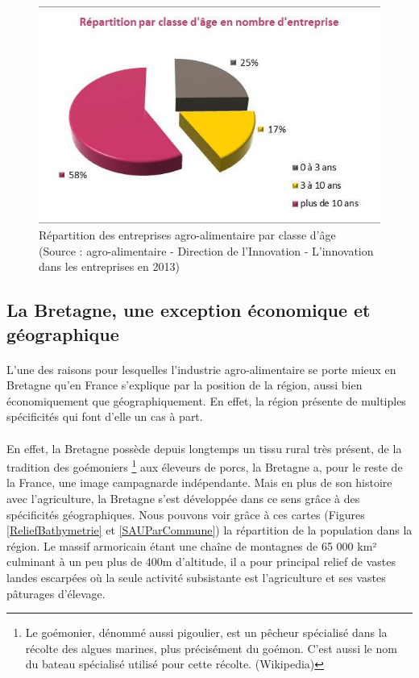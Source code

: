 \documentclass[a4paper,12pt]{report}
\begin{document}
	\begin{figure}[!h]
	\centering
	\includegraphics[scale=1]{Illustrations/RepartitionClasseAge.png}
	\caption{Répartition des entreprises agro-alimentaire par classe d'âge\\(Source : agro-alimentaire - Direction de l’Innovation - L’innovation dans les entreprises en 2013\cite{InnovationEntreprises2013})}
	\label{RepartitionParTaille}
	\end{figure}

		\subsection{La Bretagne, une exception économique et géographique}
			\paragraph{}L’une des raisons pour lesquelles l’industrie agro-alimentaire se porte mieux en Bretagne qu’en France s’explique par la position de la région, aussi bien économiquement que géographiquement. En effet, la région présente de multiples spécificités qui font d’elle un cas à part.
			
			\paragraph{}En effet, la Bretagne possède depuis longtemps un tissu rural très présent, de la tradition des goémoniers \footnote{Le goémonier, dénommé aussi pigoulier, est un pêcheur spécialisé dans la récolte des algues marines, plus précisément du goémon. C'est aussi le nom du bateau spécialisé utilisé pour cette récolte. (Wikipedia)} aux éleveurs de porcs, la Bretagne a, pour le reste de la France, une image campagnarde indépendante. Mais en plus de son histoire avec l’agriculture, la Bretagne s’est développée dans ce sens grâce à des spécificités géographiques. Nous pouvons voir grâce à ces cartes (Figures \ref{ReliefBathymetrie} et \ref{SAUParCommune}) la répartition de la population dans la région. Le massif armoricain étant une chaîne de montagnes de 65 000 km² culminant à un peu plus de 400m d’altitude, il a pour principal relief de vastes landes escarpées où la seule activité subsistante est l’agriculture et ses vastes pâturages d’élevage.
			
\end{document}
